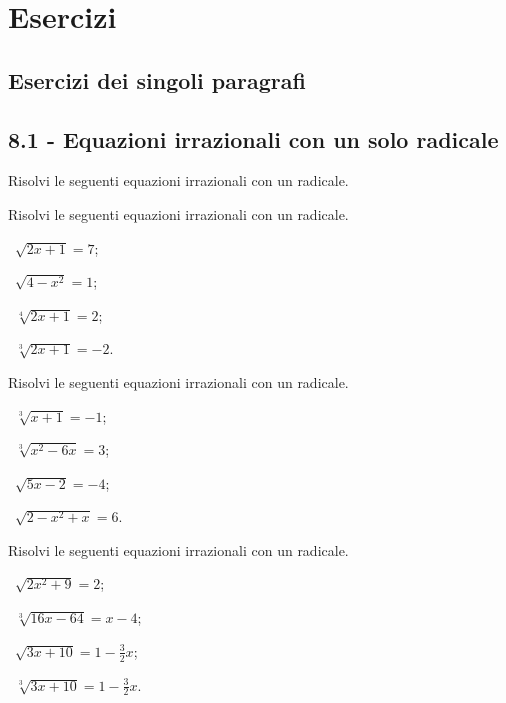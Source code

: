 \section{Esercizi}
\subsection{Esercizi dei singoli paragrafi}
\subsection*{8.1 - Equazioni irrazionali con un solo radicale}
Risolvi le seguenti equazioni irrazionali con un radicale.
\begin{esercizio}[\Ast]
 \label{ese:8.1}
Risolvi le seguenti equazioni irrazionali con un radicale.
\begin{multicols}{2}
 \begin{enumeratea}
 \item~$\sqrt{2x+1}=7$;
 \item~$\sqrt{4-x^2}=1$;
 \item~$\sqrt[4]{2x+1}=2$;
 \item~$\sqrt[3]{2x+1}=-2$.
 \end{enumeratea}
 \end{multicols}
\end{esercizio}

\begin{esercizio}
 \label{ese:8.2}
Risolvi le seguenti equazioni irrazionali con un radicale.
\begin{multicols}{2}
 \begin{enumeratea}
 \item~$\sqrt[3]{x+1}=-1$;
 \item~$\sqrt[3]{x^2-6x}=3$;
 \item~$\sqrt{5x-2}=-4$;
 \item~$\sqrt{2-x^2+x}=6$.
 \end{enumeratea}
 \end{multicols}
\end{esercizio}

\begin{esercizio}[\Ast]
 \label{ese:8.3}
Risolvi le seguenti equazioni irrazionali con un radicale.
\begin{multicols}{2}
 \begin{enumeratea}
 \item~$\sqrt{2x^2+9}=2$;
 \item~$\sqrt[3]{16x-64}=x-4$;
 \item~$\sqrt{3x+10}=1-\frac 3 2x$;
 \item~$\sqrt[3]{3x+10}=1-\frac 3 2x$.
 \end{enumeratea}
 \end{multicols}
\end{esercizio}

